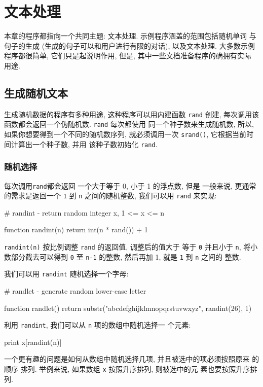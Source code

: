 \chapter{文本处理}
\label{chap:processing_words}

本章的程序都指向一个共同主题: 文本处理. 示例程序涵盖的范围包括随机单词
与句子的生成 (生成的句子可以和用户进行有限的对话), 以及文本处理. 大多数示例
程序都很简单, 它们只是起说明作用, 但是, 其中一些文档准备程序的确拥有实际
用途.

\section{生成随机文本}
\label{sec:random_text_generation}

生成随机数据的程序有多种用途, 这种程序可以用内建函数 \texttt{rand} 
创建, 每次调用该函数都会返回一个伪随机数. \texttt{rand} 每次都使用
同一个种子数来生成随机数, 所以, 如果你想要得到一个不同的随机数序列,
就必须调用一次 \texttt{srand()}, 它根据当前时间计算出一个种子数, 并用
该种子数初始化 \texttt{rand}.

\subsection{随机选择}
\label{subsec:random_choices}

 每次调用\texttt{rand}都会返回 一个大于等于 0, 小于 1 的浮点数, 但是
一般来说, 更通常的需求是返回一个 \texttt{1} 到 \texttt{n} 之间的随机整数,
我们可以用 \texttt{rand} 来实现:
\begin{awkcode}
    # randint - return random integer x, 1 <= x <= n

    function randint(n) {
        return int(n * rand()) + 1
    }
\end{awkcode}
\texttt{randint(n)} 按比例调整 \texttt{rand} 的返回值, 调整后的值大于
等于 \texttt{0} 并且小于 \texttt{n}, 将小数部分截去可以得到 \texttt{0} 
至 \texttt{n-1} 的整数, 然后再加 1, 就是 \texttt{1} 到 \texttt{n} 之间的 
整数.

我们可以用 \texttt{randint} 随机选择一个字母:
\begin{awkcode}
    # randlet - generate random lower-case letter

    function randlet() {
        return substr("abcdefghijklmnopqrstuvwxyz", randint(26), 1)
    }
\end{awkcode}

利用 \texttt{randint}, 我们可以从 \texttt{n} 项的数组中随机选择一
个元素:
\begin{awkcode}
    print x[randint(n)]
\end{awkcode}
一个更有趣的问题是如何从数组中随机选择几项, 并且被选中的项必须按照原来
的顺序 排列. 举例来说, 如果数组 \texttt{x} 按照升序排列, 则被选中的元
素也要按照升序排列.


